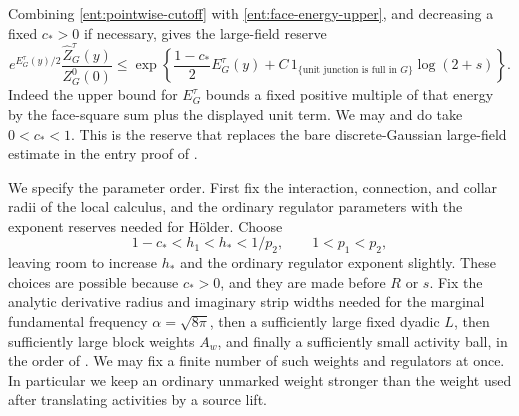 Combining \eqref{ent:pointwise-cutoff} with
\eqref{ent:face-energy-upper}, and decreasing a fixed \(c_*>0\) if
necessary, gives the large-field reserve
\begin{equation}\label{ent:large-field-reserve}
 e^{E_G^\tau(y)/2}\frac{\widehat Z_G^\tau(y)}{Z_G^0(0)}
 \le
 \exp\left\{\frac{1-c_*}{2}E_G^\tau(y)
       +C\,1_{\{\text{unit junction is full in }G\}}\log(2+s)\right\}.
\end{equation}
Indeed the upper bound for \(E_G^\tau\) bounds a fixed positive
multiple of that energy by the face-square sum plus the displayed
unit term.  We may and do take \(0<c_*<1\).  This is the reserve
that replaces the bare discrete-Gaussian large-field estimate in
the entry proof of \cite{B}.

We specify the parameter order.  First fix the interaction, connection,
and collar radii of the local calculus, and the ordinary regulator
parameters with the exponent reserves needed for H\"older.  Choose
\begin{equation}\label{ent:reserve-order}
       1-c_*<h_1<h_*<1/p_2,\qquad 1<p_1<p_2,
\end{equation}
leaving room to increase \(h_*\) and the ordinary regulator exponent
slightly.  These choices are possible because \(c_*>0\), and they
are made before \(R\) or \(s\).  Fix the analytic derivative radius
and imaginary strip widths needed for the marginal fundamental
frequency \(\alpha=\sqrt{8\pi}\), then a sufficiently large fixed
dyadic \(L\), then sufficiently large block weights \(A_w\), and
finally a sufficiently small activity ball, in the order of
\cite[Sections~4 and~8]{B}.  We may fix a finite number of such
weights and regulators at once.  In particular we keep an ordinary
unmarked weight stronger than the weight used after translating
activities by a source lift.

